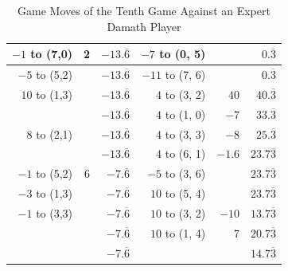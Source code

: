 \begin{appendices}
\begin{table}[H]
\begin{tabular}{rrrrrr}
          $-1$ to (7,0) & 2        &  $-13.\overline6$  & $-7$ to (0, 5) &              &  $0.\overline3$    \\ \hline
          $-5$ to (5,2) &          &  $-13.\overline6$  & $-11$ to (7, 6) &              &  $0.\overline3$    \\ \hline
          $10$ to (1,3) &          &  $-13.\overline6$  & $4$ to (3, 2) & $40$            &  $40.\overline3$    \\ \hline
                        &          &  $-13.\overline6$  & $4$ to (1, 0) & $-7$             &  $33.\overline3$    \\ \hline
          $8$ to (2,1) &          &  $-13.\overline6$  & $4$ to (3, 3) & $-8$          &  $25.\overline3$    \\ \hline
                       &          &  $-13.\overline6$  & $4$ to (6, 1) & $-1.6$          &  $23.7\overline3$    \\ \hline
          $-1$ to (5,2) & $6$     &  $-7.\overline6$  & $-5$ to (3, 6) &               &  $23.7\overline3$    \\ \hline
          $-3$ to (1,3) &         &  $-7.\overline6$  & $10$ to (5, 4) &               &  $23.7\overline3$    \\ \hline
          $-1$ to (3,3) &         &  $-7.\overline6$  & $10$ to (3, 2) & $-10$           &  $13.7\overline3$    \\ \hline
                        &         &  $-7.\overline6$  & $10$ to (1, 4) & $7$              &  $20.7\overline3$    \\ \hline \hline
                        &         &  $-7.\overline6$  &                &                  &  $14.7\overline3$    \\ \hline
    \end{tabular}
    \caption{Game Moves of the Tenth Game Against an Expert Damath Player}
    \label{tab:tenth-game}
\end{table}

\end{appendices}
